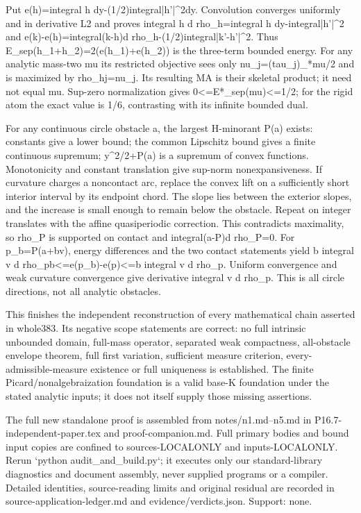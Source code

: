\documentclass[11pt]{article}
\begin{document}
Put e(h)=integral h dy-(1/2)integral|h'|\textasciicircum{}2dy. Convolution converges uniformly and in derivative L2 and proves integral h d rho\_h=integral h dy-integral|h'|\textasciicircum{}2 and e(k)-e(h)=integral(k-h)d rho\_h-(1/2)integral|k'-h'|\textasciicircum{}2. Thus E\_sep(h\_1+h\_2)=2(e(h\_1)+e(h\_2)) is the three-term bounded energy. For any analytic mass-two mu its restricted objective sees only nu\_j=(tau\_j)\_*mu/2 and is maximized by rho\_hj=nu\_j. Its resulting MA is their skeletal product; it need not equal mu. Sup-zero normalization gives 0<=E*\_sep(mu)<=1/2; for the rigid atom the exact value is 1/6, contrasting with its infinite bounded dual.

For any continuous circle obstacle a, the largest H-minorant P(a) exists: constants give a lower bound; the common Lipschitz bound gives a finite continuous supremum; y\textasciicircum{}2/2+P(a) is a supremum of convex functions. Monotonicity and constant translation give sup-norm nonexpansiveness. If curvature charges a noncontact arc, replace the convex lift on a sufficiently short interior interval by its endpoint chord. The slope lies between the exterior slopes, and the increase is small enough to remain below the obstacle. Repeat on integer translates with the affine quasiperiodic correction. This contradicts maximality, so rho\_P is supported on contact and integral(a-P)d rho\_P=0. For p\_b=P(a+bv), energy differences and the two contact statements yield b integral v d rho\_pb<=e(p\_b)-e(p)<=b integral v d rho\_p. Uniform convergence and weak curvature convergence give derivative integral v d rho\_p. This is all circle directions, not all analytic obstacles.

This finishes the independent reconstruction of every mathematical chain asserted in whole383. Its negative scope statements are correct: no full intrinsic unbounded domain, full-mass operator, separated weak compactness, all-obstacle envelope theorem, full first variation, sufficient measure criterion, every-admissible-measure existence or full uniqueness is established. The finite Picard/nonalgebraization foundation is a valid base-K foundation under the stated analytic inputs; it does not itself supply those missing assertions.

The full new standalone proof is assembled from notes/n1.md--n5.md in P16.7-independent-paper.tex and proof-companion.md. Full primary bodies and bound input copies are confined to sources-LOCALONLY and inputs-LOCALONLY. Rerun `python audit\_and\_build.py`; it executes only our standard-library diagnostics and document assembly, never supplied programs or a compiler. Detailed identities, source-reading limits and original residual are recorded in source-application-ledger.md and evidence/verdicts.json. Support: none.
\end{document}
